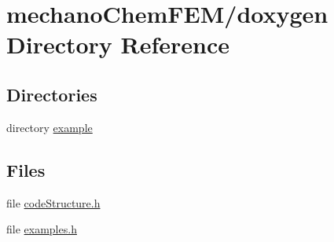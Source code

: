 \section{mechano\+Chem\+F\+E\+M/doxygen Directory Reference}
\label{dir_e6063020cb33b4b92e90416b971e25da}
\subsection*{Directories}
\begin{DoxyCompactItemize}
\item 
directory \mbox{\hyperlink{dir_b3001c7d6f49a7b7227b50e4e24b86b5}{example}}
\end{DoxyCompactItemize}
\subsection*{Files}
\begin{DoxyCompactItemize}
\item 
file \mbox{\hyperlink{code_structure_8h}{code\+Structure.\+h}}
\item 
file \mbox{\hyperlink{examples_8h}{examples.\+h}}
\end{DoxyCompactItemize}
